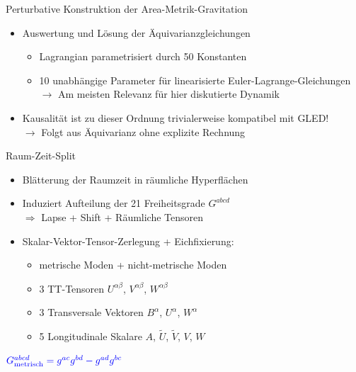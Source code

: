 \documentclass{beamer}
\begin{document}
    \begin{frame}{Perturbative Konstruktion der Area-Metrik-Gravitation}
        \begin{itemize}
            \item Auswertung und Lösung der Äquivarianzgleichungen
            \begin{itemize}
                \item Lagrangian parametrisiert durch 50 Konstanten
                \item \alert{10 unabhängige Parameter für linearisierte Euler-Lagrange-Gleichungen} \\
                $\rightarrow$ Am meisten Relevanz für hier diskutierte Dynamik
            \end{itemize}
            \item Kausalität ist zu dieser Ordnung trivialerweise kompatibel mit GLED! \\
            $\rightarrow$ Folgt aus Äquivarianz ohne explizite Rechnung
        \end{itemize}
    \end{frame}

    \begin{frame}{Raum-Zeit-Split}
        \begin{itemize}
            \item Blätterung der Raumzeit in räumliche Hyperflächen
            \item Induziert Aufteilung der 21 Freiheitsgrade $G^{abcd}$ \\ $\Rightarrow$ Lapse + Shift + Räumliche Tensoren
            \item Skalar-Vektor-Tensor-Zerlegung + Eichfixierung:
            \begin{itemize}
                \item {\color{blue}metrische Moden} + {\color{alert}nicht-metrische Moden}
                \item 3 TT-Tensoren {\color{blue}$U^{\alpha\beta}$}, {\color{alert}$V^{\alpha\beta}$}, {\color{alert}$W^{\alpha\beta}$}
                \item 3 Transversale Vektoren {\color{blue}$B^\alpha$}, {\color{alert}$U^\alpha$}, {\color{alert}$W^\alpha$}
                \item 5 Longitudinale Skalare {\color{blue}$A$}, {\color{blue}$\tilde U$}, {\color{alert}$\tilde V$}, {\color{alert}$V$}, {\color{alert}$W$}
            \end{itemize}
        \end{itemize}
        \raggedleft $\color{blue}G_{\text{metrisch}}^{abcd} = g^{ac} g^{bd} - g^{ad} g^{bc}$
    \end{frame}
\end{document}

